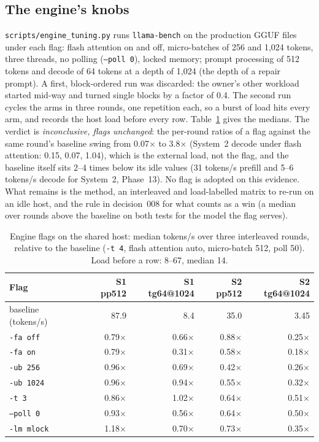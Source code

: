 \subsection{The engine's knobs}
\label{sec:p14-engine}

\texttt{scripts/engine\_tuning.py} runs \texttt{llama-bench} on the production GGUF files under each flag: flash attention on and
off, micro-batches of 256 and 1,024 tokens, three threads, no polling (\texttt{--poll 0}), locked memory; prompt processing of
512 tokens and decode of 64 tokens at a depth of 1,024 (the depth of a repair prompt). A first, block-ordered run was discarded:
the owner's other workload started mid-way and turned single blocks by a factor of 0.4. The second run cycles the arms in three
rounds, one repetition each, so a burst of load hits every arm, and records the host load before every row.
Table~\ref{tab:p14-flags} gives the medians. The verdict is \emph{inconclusive, flags unchanged}: the per-round ratios of a
flag against the same round's baseline swing from 0.07$\times$ to 3.8$\times$ (System~2 decode under flash attention: 0.15, 0.07,
1.04), which is the external load, not the flag, and the baseline itself sits 2--4 times below its idle values (31 tokens/s
prefill and 5--6 tokens/s decode for System~2, Phase~13). No flag is adopted on this evidence. What remains is the method, an
interleaved and load-labelled matrix to re-run on an idle host, and the rule in decision~008 for what counts as a win (a median
over rounds above the baseline on both tests for the model the flag serves).

\begin{table}[t]
\centering
\caption{Engine flags on the shared host: median tokens/s over three interleaved rounds, relative to the baseline
(\texttt{-t 4}, flash attention auto, micro-batch 512, poll 50). Load before a row: 8--67, median 14.}
\label{tab:p14-flags}
\scriptsize
\begin{tabular}{@{}lrrrr@{}}
\toprule
Flag & S1 pp512 & S1 tg64@1024 & S2 pp512 & S2 tg64@1024 \\
\midrule
baseline (tokens/s) & 87.9 & 8.4 & 35.0 & 3.45 \\
\texttt{-fa off} & 0.79$\times$ & 0.66$\times$ & 0.88$\times$ & 0.25$\times$ \\
\texttt{-fa on} & 0.79$\times$ & 0.31$\times$ & 0.58$\times$ & 0.18$\times$ \\
\texttt{-ub 256} & 0.96$\times$ & 0.69$\times$ & 0.42$\times$ & 0.26$\times$ \\
\texttt{-ub 1024} & 0.96$\times$ & 0.94$\times$ & 0.55$\times$ & 0.32$\times$ \\
\texttt{-t 3} & 0.86$\times$ & 1.02$\times$ & 0.64$\times$ & 0.51$\times$ \\
\texttt{--poll 0} & 0.93$\times$ & 0.56$\times$ & 0.64$\times$ & 0.50$\times$ \\
\texttt{-lm mlock} & 1.18$\times$ & 0.70$\times$ & 0.73$\times$ & 0.35$\times$ \\
\bottomrule
\end{tabular}
\end{table}

